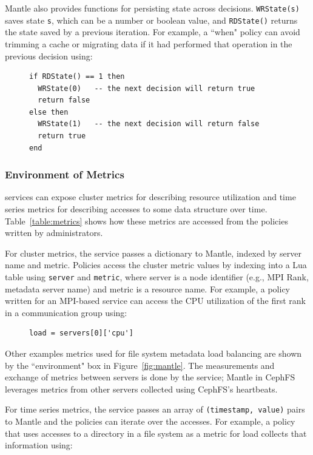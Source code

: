Mantle also provides functions for persisting state across decisions.
\texttt{WRState(s)} saves state \texttt{s}, which can be a number or boolean
value, and \texttt{RDState()} returns the state saved by a previous iteration.
For example, a ``when" policy can avoid trimming a cache or migrating data if
it had performed that operation in the previous decision using:

\begin{figure}[h]
\footnotesize
\begin{verbatim}
if RDState() == 1 then
  WRState(0)   -- the next decision will return true
  return false
else then
  WRState(1)   -- the next decision will return false
  return true
end
\end{verbatim}
\end{figure}

\subsubsection{Environment of Metrics} services can expose cluster metrics for
describing resource utilization and time series metrics for describing accesses
to some data structure over time. Table~\ref{table:metrics} shows how these
metrics are accessed from the policies written by administrators. 

For cluster metrics, the service passes a dictionary to Mantle, indexed by
server name and metric. Policies access the cluster metric values by indexing
into a Lua table using \texttt{server} and \texttt{metric}, where server is a
node identifier ({e.g.}, MPI Rank, metadata server name) and metric is a
resource name.  For example, a policy written for an MPI-based service can
access the CPU utilization of the first rank in a communication group using:

\begin{figure}[h]
\footnotesize
\begin{verbatim}
load = servers[0]['cpu']
\end{verbatim}
\end{figure}

Other examples metrics used for file system metadata load balancing are shown
by the ``environment" box in Figure~\ref{fig:mantle}. The measurements and
exchange of metrics between servers is done by the service; Mantle in CephFS
leverages metrics from other servers collected using CephFS's heartbeats.

For time series metrics, the service passes an array of \texttt{(timestamp,
value)} pairs to Mantle and the policies can iterate over the accesses. For
example, a policy that uses accesses to a directory in a file system as a
metric for load collects that information using:

